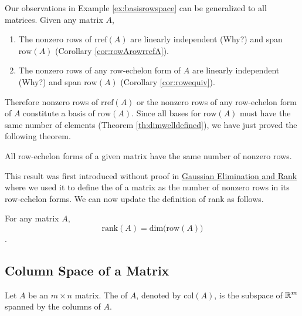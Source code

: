 \documentclass{ximera}
\begin{document}
Our observations in Example \ref{ex:basisrowspace} can be generalized to all matrices.  Given any matrix $A$,
\begin{enumerate}
    \item The nonzero rows of $\mbox{rref}(A)$ are linearly independent (Why?) and span $\mbox{row}(A)$ (Corollary \ref{cor:rowArowrrefA}).
    \item The nonzero rows of any row-echelon form of $A$ are linearly independent (Why?) and span $\mbox{row}(A)$ (Corollary \ref{cor:rowequiv}).
\end{enumerate}
Therefore nonzero rows of $\mbox{rref}(A)$ or the nonzero rows of any row-echelon form of $A$ constitute a basis of $\mbox{row}(A)$.  Since all bases for $\mbox{row}(A)$ must have the same number of elements (Theorem \ref{th:dimwelldefined}), we have just proved the following theorem.

\begin{theorem}\label{th:samenumberofnonzerorows}
All row-echelon forms of a given matrix have the same number of nonzero rows.
\end{theorem}

This result was first introduced without proof in \href{https://ximera.osu.edu/oerlinalg/LinearAlgebra/SYS-0030/main}{Gaussian Elimination and Rank} where we used it to define the  of a matrix as the number of nonzero rows in its row-echelon forms.  We can now update the definition of rank as follows.

\begin{definition}\label{th:dimofrowA}
For any matrix $A$,  
$$\mbox{rank}(A)=\mbox{dim}\Big(\mbox{row}(A)\Big)$$.
\end{definition}


\subsection*{Column Space of a Matrix}
\begin{definition}\label{def:colspace} Let $A$ be an $m\times n$ matrix.  The  of $A$, denoted by $\mbox{col}(A)$, is the subspace of $\mathbb{R}^m$ spanned by the columns of $A$.
\end{definition}
\end{document}
